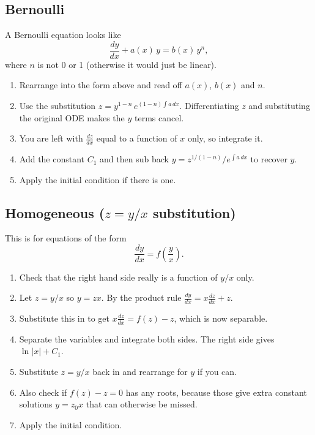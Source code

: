 \documentclass{article}
\begin{document}
\subsection{Bernoulli}
A Bernoulli equation looks like
\[
\frac{dy}{dx} + a(x)\, y = b(x)\, y^n,
\]
where $n$ is not 0 or 1 (otherwise it would just be linear).
\begin{enumerate}
    \item Rearrange into the form above and read off $a(x)$, $b(x)$ and $n$.
    \item Use the substitution $z = y^{1-n}\, e^{(1-n)\int a\,dx}$. Differentiating $z$ and substituting the original ODE makes the $y$ terms cancel.
    \item You are left with $\frac{dz}{dx}$ equal to a function of $x$ only, so integrate it.
    \item Add the constant $C_1$ and then sub back $y = z^{1/(1-n)} / e^{\int a\,dx}$ to recover $y$.
    \item Apply the initial condition if there is one.
\end{enumerate}

\subsection{Homogeneous ($z = y/x$ substitution)}
This is for equations of the form
\[
\frac{dy}{dx} = f\!\left(\frac{y}{x}\right).
\]
\begin{enumerate}
    \item Check that the right hand side really is a function of $y/x$ only.
    \item Let $z = y/x$ so $y = zx$. By the product rule $\frac{dy}{dx} = x\frac{dz}{dx} + z$.
    \item Substitute this in to get $x\frac{dz}{dx} = f(z) - z$, which is now separable.
    \item Separate the variables and integrate both sides. The right side gives $\ln|x| + C_1$.
    \item Substitute $z = y/x$ back in and rearrange for $y$ if you can.
    \item Also check if $f(z) - z = 0$ has any roots, because those give extra constant solutions $y = z_0 x$ that can otherwise be missed.
    \item Apply the initial condition.
\end{enumerate}
\end{document}
